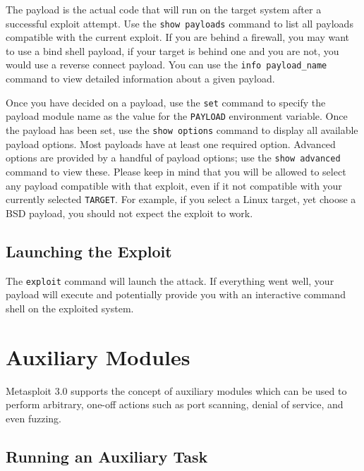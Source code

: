 \documentclass{report}
\begin{document}
\par	The payload is the actual code that will run on the target system after
a successful exploit attempt. Use the \texttt{show payloads} command to list
all payloads compatible with the current exploit. If you are behind a
firewall, you may want to use a bind shell payload, if your target is behind
one and you are not, you would use a reverse connect payload. You can use the
\texttt{info payload\_name} command to view detailed information about a given
payload.  

\par
Once you have decided on a payload, use the \texttt{set} command to specify
the payload module name as the value for the \texttt{PAYLOAD} environment
variable. Once the payload has been set, use the \texttt{show options} command
to display all available payload options. Most payloads have at least one
required option. Advanced options are provided by a handful of payload
options; use the \texttt{show advanced} command to view these. Please keep in
mind that you will be allowed to select any payload compatible with that
exploit, even if it not compatible with your currently selected
\texttt{TARGET}. For example, if you select a Linux target, yet choose a BSD
payload, you should not expect the exploit to work.

		\subsection{Launching the Exploit}

\par The \texttt{exploit} command will launch the attack. If everything went
well, your payload will execute and potentially provide you with an
interactive command shell on the exploited system. 

	\section{Auxiliary Modules}

\par
Metasploit 3.0 supports the concept of auxiliary modules which can be used to
perform arbitrary, one-off actions such as port scanning, denial of service,
and even fuzzing.
	
		\subsection{Running an Auxiliary Task}
\end{document}

